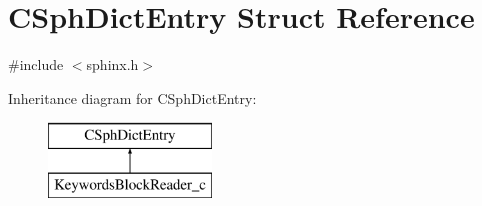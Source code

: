 \hypertarget{structCSphDictEntry}{\section{C\-Sph\-Dict\-Entry Struct Reference}
\label{structCSphDictEntry}
}


{\ttfamily \#include $<$sphinx.\-h$>$}

Inheritance diagram for C\-Sph\-Dict\-Entry\-:\begin{figure}[H]
\begin{center}
\leavevmode
\includegraphics[height=2.000000cm]{structCSphDictEntry}
\end{center}
\end{figure}
